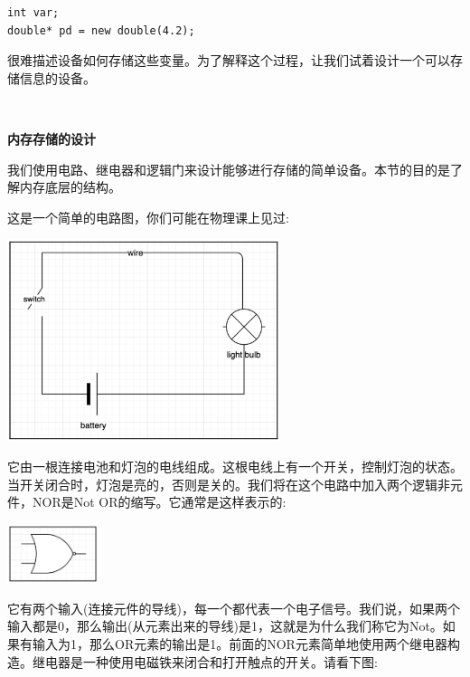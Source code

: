 \begin{lstlisting}[caption={}]
int var;
double* pd = new double(4.2);
\end{lstlisting}

很难描述设备如何存储这些变量。为了解释这个过程，让我们试着设计一个可以存储信息的设备。 \par

\noindent\textbf{}\ \par
\textbf{内存存储的设计} \ \par
我们使用电路、继电器和逻辑门来设计能够进行存储的简单设备。本节的目的是了解内存底层的结构。 \par
这是一个简单的电路图，你们可能在物理课上见过: \par

\begin{center}
	\includegraphics[width=0.6\textwidth]{content/Section-1/Chapter-5/1}
\end{center}

它由一根连接电池和灯泡的电线组成。这根电线上有一个开关，控制灯泡的状态。当开关闭合时，灯泡是亮的，否则是关的。我们将在这个电路中加入两个逻辑非元件，NOR是Not OR的缩写。它通常是这样表示的: \par

\begin{center}
	\includegraphics[width=0.2\textwidth]{content/Section-1/Chapter-5/2}
\end{center}

它有两个输入(连接元件的导线)，每一个都代表一个电子信号。我们说，如果两个输入都是0，那么输出(从元素出来的导线)是1，这就是为什么我们称它为Not。如果有输入为1，那么OR元素的输出是1。前面的NOR元素简单地使用两个继电器构造。继电器是一种使用电磁铁来闭合和打开触点的开关。请看下图: \par

